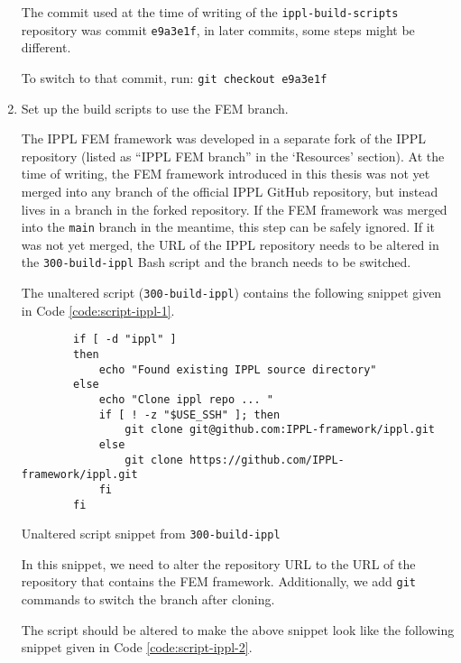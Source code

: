 \begin{enumerate}
          The commit used at the time of writing of the \texttt{ippl-build-scripts} repository was commit \texttt{e9a3e1f},
          in later commits, some steps might be different.

          To switch to that commit, run: \texttt{git checkout e9a3e1f}

    \item Set up the build scripts to use the FEM branch.

          The IPPL FEM framework was developed in a separate fork of the IPPL repository (listed as ``IPPL FEM branch'' in the `Resources' section).
          At the time of writing, the FEM framework introduced in this thesis was not yet merged
          into any branch of the official IPPL GitHub repository, but instead lives in a branch in the forked repository.
          If the FEM framework was merged into the \texttt{main} branch in the meantime, this step can be safely ignored.
          If it was not yet merged, the URL of the IPPL repository needs to be altered in the \texttt{300-build-ippl} Bash script and the branch needs to be switched.

          The unaltered script (\texttt{300-build-ippl}) contains the following snippet given in Code \ref{code:script-ippl-1}.

          \begin{Code}
              \begin{verbatim}
        if [ -d "ippl" ] 
        then
            echo "Found existing IPPL source directory"
        else
            echo "Clone ippl repo ... "
            if [ ! -z "$USE_SSH" ]; then
                git clone git@github.com:IPPL-framework/ippl.git
            else
                git clone https://github.com/IPPL-framework/ippl.git
            fi
        fi
          \end{verbatim}
              \caption{Unaltered script snippet from \texttt{300-build-ippl}}
              \label{code:script-ippl-1}
          \end{Code}

          In this snippet, we need to alter the repository URL to the URL of the repository that contains
          the FEM framework. Additionally, we add \texttt{git} commands to switch the branch after cloning.

          The script should be altered to make the above snippet look like the following snippet given in Code \ref{code:script-ippl-2}.


\end{enumerate}
